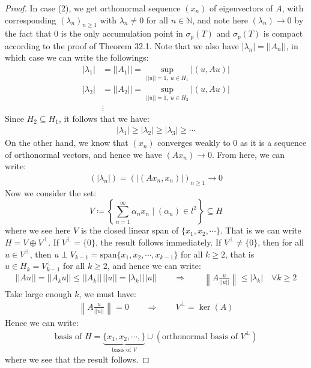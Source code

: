 \documentclass[11pt]{book}
\theoremstyle{break}
\theoremstyle{break}
\newcommand{\N}{\mathbb{N}}
\newcommand{\spa}{\text{span}}
\begin{document}
\begin{proof}
In case (2), we get orthonormal sequence $(x_n)$ of eigenvectors of $A$, with corresponding $(\lambda_n)_{n\geq 1}$ with $\lambda_n \neq 0$ for all $n \in \N$, and note here $(\lambda_n) \to 0$ by the fact that $0$ is the only accumulation point in $\sigma_p(T)$ and $\sigma_p(T)$ is compact according to the proof of Theorem 32.1. Note that we also have $|\lambda_n| = ||A_n||$, in which case we can write the followings:
\begin{align*}
|\lambda_1 | &= ||A_1|| = \sup_{||u||=1,\ u\in H_1}|(u,Au)|\\
|\lambda_2 | &= ||A_2|| = \sup_{||u||=1,\ u\in H_2}|(u,Au)|\\
&\vdots
\end{align*} 
Since $H_2 \subseteq H_1$, it follows that we have:
\begin{align*}
|\lambda_1 | \geq |\lambda_2 | \geq |\lambda_3| \geq\cdots
\end{align*}
On the other hand, we know that $(x_n)$ converges weakly to $0$ as it is a sequence of orthonormal vectors, and hence we have $(Ax_n) \to 0$. From here, we can write:
\begin{align*}
(|\lambda_n|) = (|(Ax_n, x_n)|)_{n\geq 1} \to 0
\end{align*}
Now we consider the set: 
$$V \coloneqq \left\{ \sum_{n=1}^\infty \alpha_n x_n \mid (\alpha_n) \in l^2\right\} \subseteq H$$ 
where we see here $V$ is the closed linear span of $\{x_1,x_2,\cdots\}$. That is we can write $H = V \oplus V^{\perp}$. If $V^{\perp} = \{0\}$, the result follows immediately. If $V^{\perp} \neq \{0\}$, then for all $u \in V^{\perp}$, then $u \perp V_{k-1} = \spa\{x_1,x_2,\cdots, x_{k-1}\}$ for all $k \geq 2$, that is $u \in H_k = V_{k-1}^\perp$ for all $k \geq 2$, and hence we can write:
\begin{align*}
||Au|| = ||A_k u|| \leq ||A_k|| \, ||u|| = |\lambda_k| \, ||u|| \qquad \Rightarrow \qquad \left\| A\frac{u}{||u||}\right\| \leq |\lambda_k| \quad \forall 	k \geq 2
\end{align*} 
Take large enough $k$, we must have:
\begin{align*}
\left\| A \frac{u}{||u||}\right\| = 0 \qquad \Rightarrow \qquad V^{\perp} = \ker(A)
\end{align*}
Hence we can write:
\begin{align*}
\text{basis of }H = \underbrace{\{x_1,x_2,\cdots, \}}_{\text{basis of }V} \cup \left(\text{orthonormal basis of $V^{\perp}$}\right)
\end{align*}
where we see that the result follows.
\end{proof}
\end{document}
